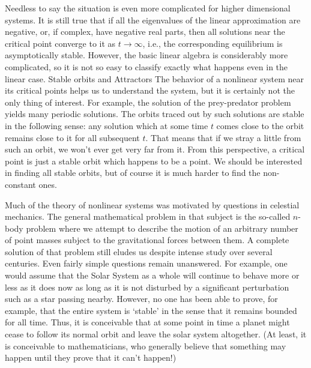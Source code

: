 Needless to say the situation is even more complicated for higher dimensional
systems.  It is still true
that if all the eigenvalues of the linear approximation
 are negative, or, if complex,
have negative real parts, then all solutions near the critical point
 converge to it as $t \to \infty$, i.e., the corresponding equilibrium
is  asymptotically stable.  However, the basic linear algebra
is considerably more complicated, so it is not so easy to classify
exactly what happens even in the linear case.   
\medskip
\subhead Stable orbits and Attractors \endsubhead
The behavior of a nonlinear system near its critical points  
helps us to understand the  system, but it is certainly not the only
thing of interest.   For example, the solution of the
prey-predator problem yields many periodic solutions.  The orbits
traced out by such solutions are 
 stable in the following sense:  any  solution
which at some time $t$ comes close to the orbit remains close to it
%
%
for all subsequent $t$.   That means that if we stray a little from
such an orbit, we won't ever get very far from it.   From this
perspective, a critical point is just a stable orbit which happens
to be a point.  We should be interested in finding all
stable orbits, but of course it is much harder to find the
non-constant ones.

Much of the theory of nonlinear systems was motivated by questions
in celestial
mechanics.   The general mathematical problem in that subject is
the so-called $n$-body problem where we attempt to describe the
motion of an arbitrary number of point masses subject to 
the gravitational forces between them.   A complete solution
of that problem still eludes us despite intense study over several
centuries.   Even fairly simple questions remain unanswered.
For example, one would assume that the Solar System as a whole
will continue to behave more or less as it does now as long as it is
not disturbed by a significant perturbation such as a
star passing nearby.   However, no one has been able to prove, for
example, that the entire system is `stable' in the
sense that it remains bounded
for all time.
Thus, it is conceivable that at some point in time a
  planet might cease to follow its normal orbit and leave the solar
system altogether.  (At least, it is conceivable to mathematicians,
who generally believe that something may happen until they 
prove that it can't happen!)

